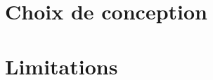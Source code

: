 \documentclass{report}
\begin{document}
\chapter{Choix de conception}

\begin{itemize}
 
\end{itemize}

\chapter{Limitations}
\begin{itemize}

\end{itemize}
\end{document}
